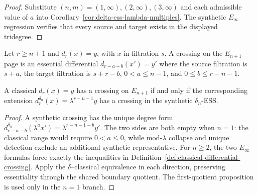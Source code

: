 \begin{proof}
  Substitute $(n,m)=(1,\infty),(2,\infty),(3,\infty)$ and each admissible
  value of $a$ into Corollary~\ref{cor:delta-ess-lambda-multiples}.  The
  synthetic $E_\infty$ regression verifies that every source and target exists
  in the displayed tridegree.
\end{proof}

\begin{definition}
  \label{def:classical-differential-crossing}
  \leanok
  Let $r\ge n+1$ and $d_r(x)=y$, with $x$ in filtration $s$.  A crossing on
  the $E_{n+1}$ page is an essential differential
  $d_{r-a-b}(x')=y'$ where the source filtration is $s+a$, the target
  filtration is $s+r-b$, $0<a\le n-1$, and
  $0\le b\le r-n-1$.
\end{definition}

\begin{proposition}
  \label{prop:classical-crossing-iff-delta-crossing}
  \notready
  A classical $d_r(x)=y$ has a crossing on $E_{n+1}$ if and only if the
  corresponding extension
  $d_r^{\delta_n}(x)=\lambda^{r-n-1}y$ has a crossing in the synthetic
  $\delta_n$-ESS.
\end{proposition}

\begin{proof}
  A synthetic crossing has the unique degree form
  $d_{r-a-b}^{\delta_n}(\lambda^a x')=\lambda^{r-n-1-b}y'$.  The two
  sides are both empty when $n=1$: the classical range would require
  $0<a\le0$, while mod-$\lambda$ collapse and unique detection exclude an
  additional synthetic representative.  For $n\ge2$, the two $E_\infty$
  formulas force exactly the inequalities in
  Definition~\ref{def:classical-differential-crossing}.  Apply the
  $\delta$--classical equivalence in each direction, preserving essentiality
  through the shared boundary quotient.  The first-quotient proposition is
  used only in the $n=1$ branch.
\end{proof}

